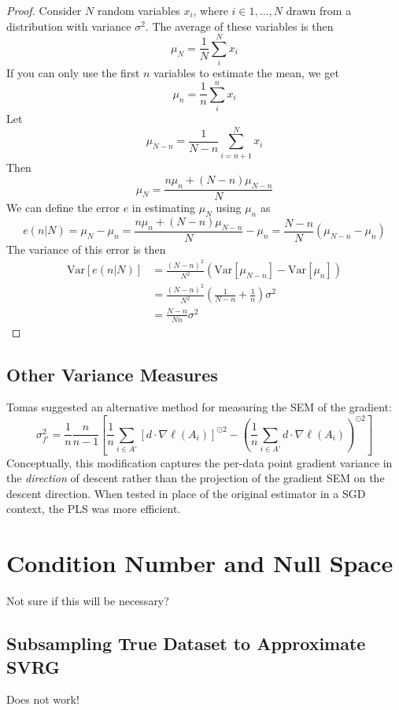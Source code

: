 \documentclass{article}
\begin{document}
\begin{proof}
Consider $N$ random variables $x_i$, where $i\in 1,\ldots,N$ drawn from a distribution with variance $\sigma^2$. The average of these variables is then 
\[ \mu_N = \frac{1}{N}\sum_i^N x_i \]
If you can only use the first $n$ variables to estimate the mean, we get 
\[ \mu_n = \frac{1}{n}\sum_i^n x_i \]
Let 
\[\mu_{N-n} = \frac{1}{N-n}\sum_{i=n+1}^N x_i\]
Then
\[ \mu_N = \frac{n \mu_n + (N-n)\mu_{N-n}}{N} \]
We can define the error $e$ in estimating $\mu_N$ using $\mu_n$ as
\[ e(n|N) = \mu_N-\mu_n = \frac{n\mu_n + (N-n)\mu_{N-n}}{N}-\mu_n = \frac{N-n}{N}(\mu_{N-n}-\mu_n)\]
The variance of this error is then 
\begin{align*}
\text{Var}[e(n|N)] &= \frac{(N-n)^2}{N^2}\left( \text{Var}[\mu_{N-n}] - \text{Var}[\mu_n] \right) \\
&= \frac{(N-n)^2}{N^2} \left(\frac{1}{N-n} +\frac{1}{n} \right) \sigma^2 \\
&= \frac{N-n}{Nn}\sigma^2
\end{align*}
\end{proof}
\subsection{Other Variance Measures}
Tomas suggested an alternative method for measuring the SEM of the gradient: 
\begin{equation}
\label{eq:sdf_tomas} \sigma_{f'}^2 = \frac{1}{n}\frac{n}{n-1} \left[ \frac{1}{n} \sum_{i \in A'} \left[d \cdot \nabla \ell(A_i) \right]^{\odot 2} - \left(\frac{1}{n} \sum_{i \in A'} d\cdot\nabla \ell(A_i) \right)^{\odot 2} \right]
\end{equation}
Conceptually, this modification captures the per-data point gradient variance in the \emph{direction} of descent rather than the projection of the gradient SEM on the descent direction. When tested in place of the original estimator in a SGD context, the PLS was more efficient.
\section{Condition Number and Null Space}
Not sure if this will be necessary?
\subsection{Subsampling True Dataset to Approximate SVRG}
Does not work!
\end{document}
